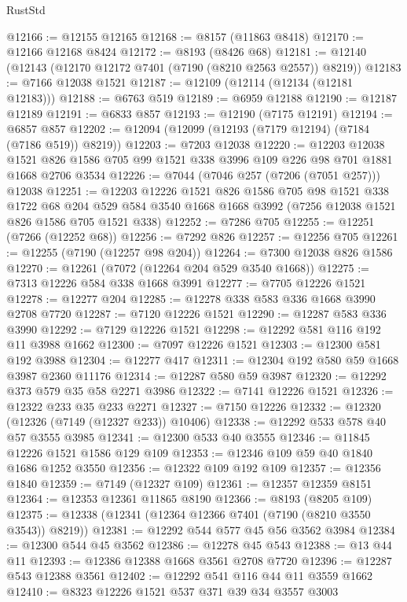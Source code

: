 \begin{lexlean}{RustStd}
\begin{coremodule}
@12166 := @12155 @12165
@12168 := @8157 (@11863 @8418)
@12170 := @12166 @12168 @8424
@12172 := @8193 (@8426 @68)
@12181 := @12140 (@12143 (@12170 @12172 @7401 (@7190 (@8210 @2563 @2557)) @8219))
@12183 := @7166 @12038 @1521
@12187 := @12109 (@12114 (@12134 (@12181 @12183)))
@12188 := @6763 @519
@12189 := @6959 @12188
@12190 := @12187 @12189
@12191 := @6833 @857
@12193 := @12190 (@7175 @12191)
@12194 := @6857 @857
@12202 := @12094 (@12099 (@12193 (@7179 @12194) (@7184 (@7186 @519)) @8219))
@12203 := @7203 @12038
@12220 := @12203
    @12038
    @1521
    @826
    @1586
    @705
    @99
    @1521
    @338
    @3996
    @109
    @226
    @98
    @701
    @1881
    @1668
    @2706
    @3534
@12226 := @7044 (@7046 @257 (@7206 (@7051 @257))) @12038
@12251 := @12203
    @12226
    @1521
    @826
    @1586
    @705
    @98
    @1521
    @338
    @1722
    @68
    @204
    @529
    @584
    @3540
    @1668
    @1668
    @3992
    (@7256 @12038 @1521 @826 @1586 @705 @1521 @338)
@12252 := @7286 @705
@12255 := @12251 (@7266 (@12252 @68))
@12256 := @7292 @826
@12257 := @12256 @705
@12261 := @12255 (@7190 (@12257 @98 @204))
@12264 := @7300 @12038 @826 @1586
@12270 := @12261 (@7072 (@12264 @204 @529 @3540 @1668))
@12275 := @7313 @12226 @584 @338 @1668 @3991
@12277 := @7705 @12226 @1521
@12278 := @12277 @204
@12285 := @12278 @338 @583 @336 @1668 @3990 @2708 @7720
@12287 := @7120 @12226 @1521
@12290 := @12287 @583 @336 @3990
@12292 := @7129 @12226 @1521
@12298 := @12292 @581 @116 @192 @11 @3988 @1662
@12300 := @7097 @12226 @1521
@12303 := @12300 @581 @192 @3988
@12304 := @12277 @417
@12311 := @12304 @192 @580 @59 @1668 @3987 @2360 @11176
@12314 := @12287 @580 @59 @3987
@12320 := @12292 @373 @579 @35 @58 @2271 @3986
@12322 := @7141 @12226 @1521
@12326 := @12322 @233 @35 @233 @2271
@12327 := @7150 @12226
@12332 := @12320 (@12326 (@7149 (@12327 @233)) @10406)
@12338 := @12292 @533 @578 @40 @57 @3555 @3985
@12341 := @12300 @533 @40 @3555
@12346 := @11845 @12226 @1521 @1586 @129 @109
@12353 := @12346 @109 @59 @40 @1840 @1686 @1252 @3550
@12356 := @12322 @109 @192 @109
@12357 := @12356 @1840
@12359 := @7149 (@12327 @109)
@12361 := @12357 @12359 @8151
@12364 := @12353 @12361 @11865 @8190
@12366 := @8193 (@8205 @109)
@12375 := @12338 (@12341 (@12364 @12366 @7401 (@7190 (@8210 @3550 @3543)) @8219))
@12381 := @12292 @544 @577 @45 @56 @3562 @3984
@12384 := @12300 @544 @45 @3562
@12386 := @12278 @45 @543
@12388 := @13 @44 @11
@12393 := @12386 @12388 @1668 @3561 @2708 @7720
@12396 := @12287 @543 @12388 @3561
@12402 := @12292 @541 @116 @44 @11 @3559 @1662
@12410 := @8323 @12226 @1521 @537 @371 @39 @34 @3557 @3003

\end{coremodule}
\end{lexlean}
